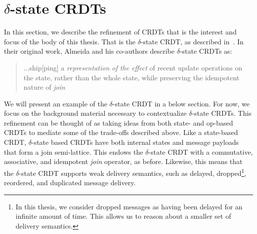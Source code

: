 \section{$\delta$-state CRDTs}
In this section, we describe the refinement of CRDTs that is the interest and
focus of the body of this thesis. That is the $\delta$-state CRDT, as described
in~\citep{almedia18}. In their original work, Almeida and his co-authors
describe $\delta$-state CRDTs as:
\begin{quote}
...ship[ping] a \textit{representation of the effect} of recent update operations
on the state, rather than the whole state, while preserving the idempotent
nature of \textit{join}
\end{quote}

We will present an example of the $\delta$-state CRDT in a below section. For
now, we focus on the background material necessary to contextualize
$\delta$-state CRDTs. This refinement can be thought of as taking ideas from
both state- and op-based CRDTs to mediate some of the trade-offs described
above. Like a state-based CRDT, $\delta$-state based CRDTs have both internal
states and message payloads that form a join semi-lattice. This endows the
$\delta$-state CRDT with a commutative, associative, and idempotent \emph{join}
operator, as before. Likewise, this means that the $\delta$-state CRDT supports
weak delivery semantics, such as delayed, dropped\footnote{In this thesis, we
consider dropped messages as having been delayed for an infinite amount of time.
This allows us to reason about a smaller set of delivery semantics.}, reordered,
and duplicated message delivery.

